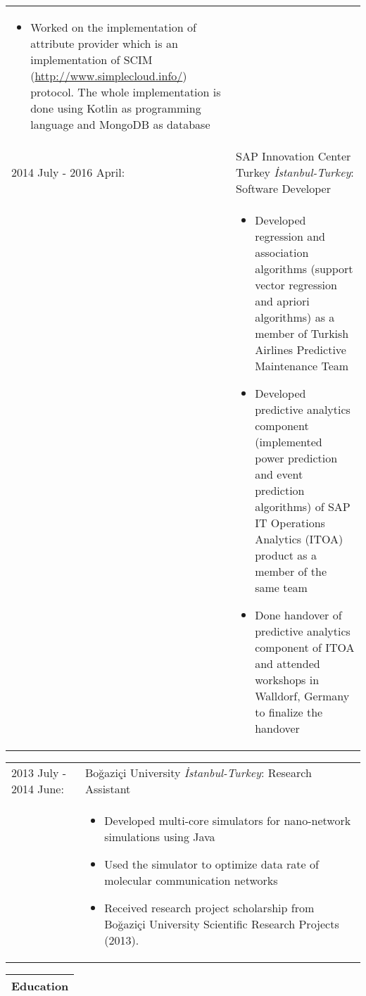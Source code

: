 \documentclass[11pt]{article}
\newcommand{\bigspace}{\vspace{0.4cm}}
\begin{document}
\begin{tabular}{p{5.5cm} p{12.5cm}}
\begin{itemize}
\item Worked on the implementation of attribute provider which is an implementation of SCIM (\url{http://www.simplecloud.info/}) protocol. The whole implementation is done using Kotlin as programming language and MongoDB as database
\vspace{-10pt}
\end{itemize}\\
2014 July - 2016 April:      & SAP Innovation Center Turkey \textit{\.{I}stanbul-Turkey}: Software Developer \\
							 &
\begin{itemize}
\setlength\itemsep{0em}
\vspace{-15pt}
\item Developed regression and association algorithms (support vector regression and apriori algorithms) as a member of Turkish Airlines Predictive Maintenance Team
\item Developed predictive analytics component (implemented power prediction and event prediction algorithms) of SAP IT Operations Analytics (ITOA) product as a member of the same team
\item Done handover of predictive analytics component of ITOA and attended workshops in Walldorf, Germany to finalize the handover
\vspace{-10pt}
\end{itemize}\\
\end{tabular}
\begin{tabular}{p{5.5cm} p{12.5cm}}
2013 July - 2014 June:       & Bo\u{g}azi\c{c}i University \textit{\.{I}stanbul-Turkey}: Research Assistant \\
							 &
\begin{itemize}
\setlength\itemsep{0em}
\vspace{-15pt}
\item Developed multi-core simulators for nano-network simulations using Java
\item Used the simulator to optimize data rate of molecular communication networks
\item Received research project scholarship from Bo\u{g}azi\c{c}i University Scientific Research Projects (2013).
\vspace{-10pt}
\end{itemize}\\
\end{tabular}


\begin{tabular}{p{18cm}}
\textbf{Education} \\
\hline
\end{tabular}
\end{document}
